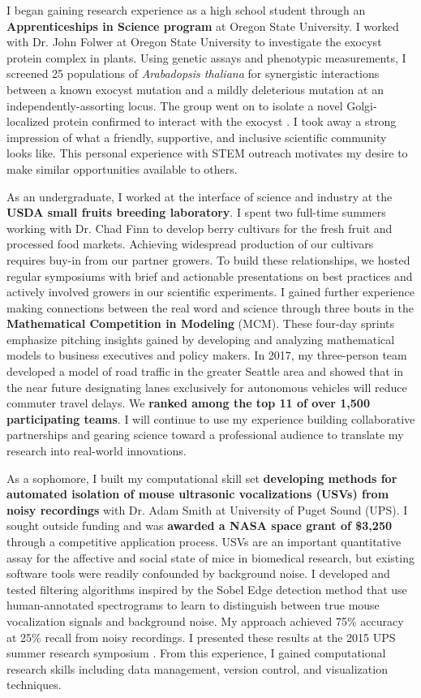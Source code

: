 \noindent
\underline{}
I began gaining research experience as a high school student through an \textbf{Apprenticeships in Science program} at Oregon State University.
I worked with Dr. John Folwer at Oregon State University to investigate the exocyst protein complex in plants.
Using genetic assays and phenotypic measurements, I screened 25 populations of \textit{Arabadopsis thaliana} for synergistic interactions between a known exocyst mutation and a mildly deleterious mutation at an independently-assorting locus.
The group went on to isolate a novel Golgi-localized protein confirmed to interact with the exocyst \cite{fowler}.
I took away a strong impression of what a friendly, supportive, and inclusive scientific community looks like.
This personal experience with STEM outreach motivates my desire to make similar opportunities available to others.

As an undergraduate, I worked at the interface of science and industry at the \textbf{USDA small fruits breeding laboratory}.
I spent two full-time summers working with Dr. Chad Finn to develop berry cultivars for the fresh fruit and processed food markets.
Achieving widespread production of our cultivars requires buy-in from our partner growers.
To build these relationships, we hosted regular symposiums with brief and actionable presentations on best practices and actively involved growers in our scientific experiments.
I gained further experience making connections between the real word and science through three bouts in the \textbf{Mathematical Competition in Modeling} (MCM).
These four-day sprints emphasize pitching insights gained by developing and analyzing mathematical models to business executives and policy makers.
In 2017, my three-person team developed a model of road traffic in the greater Seattle area and showed that in the near future designating lanes exclusively for autonomous vehicles will reduce commuter travel delays.
We \textbf{ranked among the top 11 of over 1,500 participating teams}.
I will continue to use my experience  building collaborative partnerships and gearing science toward a professional audience to translate my research into real-world innovations.

As a sophomore, I built my computational skill set \textbf{developing methods for automated isolation of mouse
ultrasonic vocalizations (USVs) from noisy recordings} with Dr. Adam Smith at University of Puget Sound (UPS).
I sought outside funding and was \textbf{awarded a NASA space grant of \$3,250} through a competitive application process.
USVs are an important quantitative assay for the affective and social state of mice in biomedical research, but existing software tools were readily confounded by background noise.
I developed and tested filtering algorithms inspired by the Sobel Edge detection method that use human-annotated spectrograms to learn to distinguish between true mouse vocalization signals and background noise.
My approach achieved 75\% accuracy at 25\% recall from noisy recordings.
I presented these results at the 2015 UPS summer research symposium \cite{smith}.
From this experience, I gained computational research skills including data management, version control, and visualization techniques.

